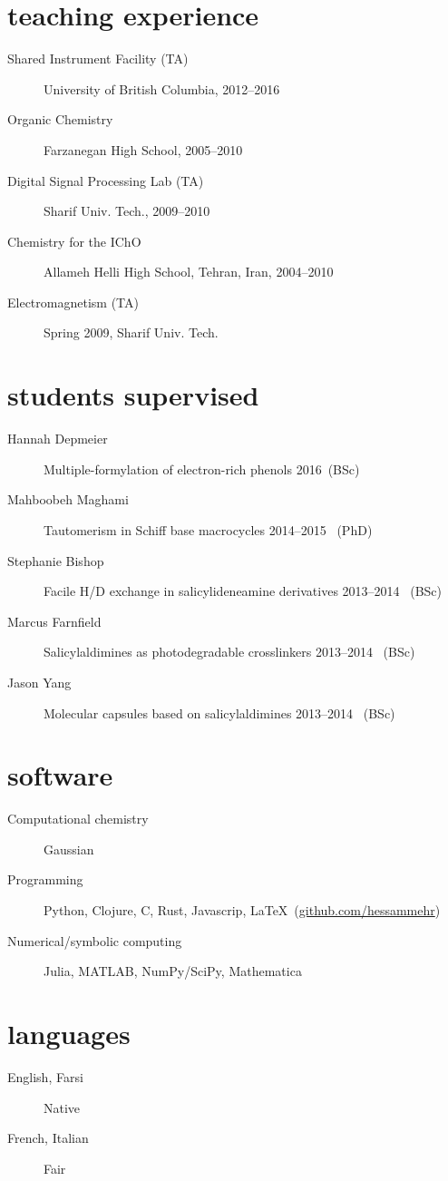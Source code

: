 \documentclass[overlapped,line,10pt,letterpaper]{res}
\begin{document}
\begin{resume}
\section{teaching experience}
\begin{description}
\item[Shared Instrument Facility (TA)] University of British Columbia, 2012–2016
\item[Organic Chemistry] Farzanegan High School, 2005–2010
\item[Digital Signal Processing Lab (TA)] Sharif Univ. Tech., 2009–2010
\item[Chemistry for the IChO] Allameh Helli High School, Tehran, Iran, 2004–2010
\item[Electromagnetism (TA)] Spring 2009, Sharif Univ. Tech.
\end{description}

\section{students supervised}
\begin{description}
\item[Hannah Depmeier] Multiple-formylation of electron-rich phenols \hspace{\fill} 2016\, (BSc)
\item[Mahboobeh Maghami] Tautomerism in Schiff base macrocycles \hspace{\fill} 2014–2015 \, (PhD)
\item[Stephanie Bishop] Facile H/D exchange in salicylideneamine derivatives \hspace{\fill} 2013–2014 \, (BSc)
\item[Marcus Farnfield]  Salicylaldimines as photodegradable crosslinkers \hspace{\fill} 2013–2014 \, (BSc)
\item[Jason Yang]  Molecular capsules based on salicylaldimines \hspace{\fill} 2013–2014 \, (BSc)
\end{description}

\section{software}
\begin{description}
\item[Computational chemistry] Gaussian
\item[Programming] Python, Clojure, C, Rust, Javascrip, \LaTeX \ (\href{https://github.com/hessammehr}{github.com/hessammehr})
\item[Numerical/symbolic computing] Julia, MATLAB, NumPy/SciPy, Mathematica
\end{description}

\section{languages}
\begin{description}
\item[English, Farsi] Native
\item[French, Italian] Fair
\end{description}
\end{resume}
\end{document}
